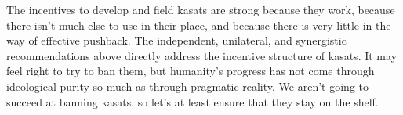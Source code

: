The incentives to develop and field \acp{kasat} are strong because
they work, because there isn't much else to use in their place, and
because there is very little in the way of effective pushback.  The
independent, unilateral, and synergistic recommendations above
directly address the incentive structure of \acp{kasat}.  It may feel
right to try to ban them, but humanity's progress has not come through
ideological purity so much as through pragmatic reality.  We aren't
going to succeed at banning \aclp{kasat}, so let's at least ensure
that they stay on the shelf.

